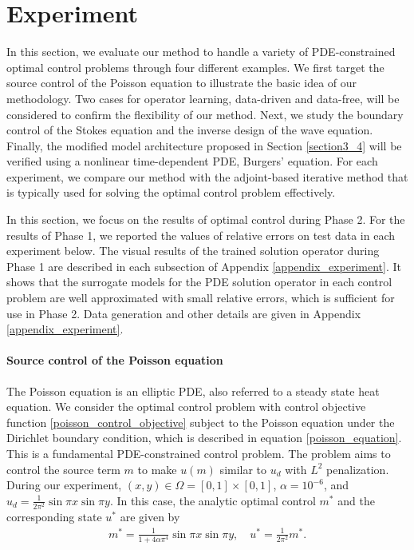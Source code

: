 \documentclass[letterpaper]{article}
\begin{document}
\section*{Experiment}\label{experiment}
In this section, we evaluate our method to handle a variety of PDE-constrained optimal control problems through four different examples. We first target the source control of the Poisson equation to illustrate the basic idea of our methodology. Two cases for operator learning, data-driven and data-free, will be considered to confirm the flexibility of our method. Next, we study the boundary control of the Stokes equation and the inverse design of the wave equation. Finally, the modified model architecture proposed in Section \ref{section3_4} will be verified using a nonlinear time-dependent PDE, Burgers' equation. For each experiment, we compare our method with the adjoint-based iterative method that is typically used for solving the optimal control problem effectively.



In this section, we focus on the results of optimal control during Phase 2. For the results of Phase 1, we reported the values of relative errors on test data in each experiment below. The visual results of the trained solution operator during Phase 1 are described in each subsection of Appendix \ref{appendix_experiment}. It shows that the surrogate models for the PDE solution operator in each control problem are well approximated with small relative errors, which is sufficient for use in Phase 2. Data generation and other details are given in Appendix \ref{appendix_experiment}.



\paragraph{Source control of the Poisson equation}
The Poisson equation is an elliptic PDE, also referred to a steady state heat equation. We consider the optimal control problem with control objective function \eqref{poisson_control_objective} subject to the Poisson equation under the Dirichlet boundary condition, which is described in equation \eqref{poisson_equation}. This is a fundamental PDE-constrained control problem. The problem aims to control the source term $m$ to make $u(m)$ similar to $u_d$ with $L^2$ penalization. During our experiment, $(x,y) \in \Omega = [0, 1]\times [0, 1]$, $\alpha = 10^{-6}$, and $u_d = \frac{1}{2 \pi^2} \sin \pi x \sin \pi y$. In this case, the analytic optimal control $m^*$ and the corresponding state $u^*$ are given by 
\begin{align}
  m^* = \frac{1}{1+ 4 \alpha \pi^4} \sin \pi x \sin \pi y, \quad
  u^* = \frac{1}{2 \pi^2} m^*.
\end{align}
\end{document}
